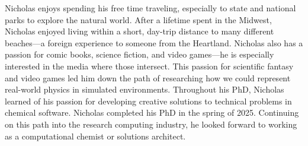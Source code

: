 Nicholas enjoys spending his free time traveling, especially to state and national parks to explore the natural world.
After a lifetime spent in the Midwest, Nicholas enjoyed living within a short, day-trip distance to many different beaches---a foreign experience to someone from the Heartland.
Nicholas also has a passion for comic books, science fiction, and video games---he is especially interested in the media where those intersect.
This passion for scientific fantasy and video games led him down the path of researching how we could represent real-world physics in simulated environments.
Throughout his PhD, Nicholas learned of his passion for developing creative solutions to technical problems in chemical software. 
Nicholas completed his PhD in the spring of 2025.
Continuing on this path into the research computing industry, he looked forward to working as a computational chemist or solutions architect.
